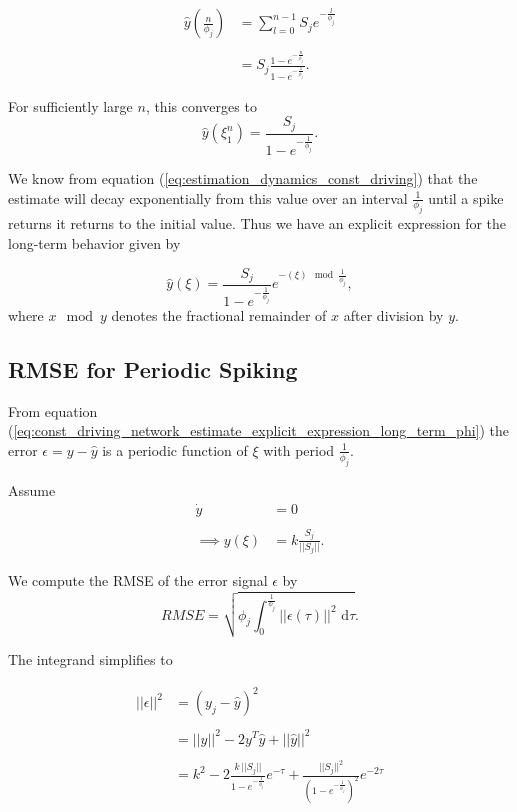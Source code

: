 \begin{align*}
\hat{y}(\frac{n}{\phi_j}) &= \sum_{l=0}^{n-1} S_j e^{- \frac{l}{\phi_j}}  \\
\\
&= S_j \frac
{ 1 - e^{-\frac{n}{\phi_j}}  }
{ 1 - e^{-\frac{1}{\phi_j}}  }.
\end{align*}

For sufficiently large $n$, this converges to 
$$
\hat{y}(\xi_1^n) = \frac{S_j}{1 - e^{-\frac{1}{\phi_j}}}.
$$



We know from equation (\ref{eq:estimation_dynamics_const_driving}) that the estimate will decay exponentially from this value over an interval $\frac{1}{\phi_j}$ until a spike returns it returns to the initial value. Thus we have an explicit expression for the long-term behavior given by 

\begin{equation}
\label{eq:const_driving_network_estimate_explicit_expression_long_term_phi}
\hat{y}(\xi) =
\frac{S_j}{1 - e^{-\frac{1}{\phi_j}}} e^{- (\xi) \mod{\frac{1}{\phi_j}}},
\end{equation} 
where $x \mod{y}$ denotes the fractional remainder of $x$ after division by $y$. 







\subsection{ RMSE for Periodic Spiking} From equation (\ref{eq:const_driving_network_estimate_explicit_expression_long_term_phi}) the error $\epsilon = y - \hat{y}$ is a periodic function of $\xi$ with period $\frac{1}{\phi_j}$. 

Assume 
\begin{align*}
 \dot{y} &= 0 
 \\
 \\
 \implies y(\xi) &= k \frac{S_j}{||S_j||}.
\end{align*}
 
We compute the  RMSE of the error signal  $\epsilon$ by 
\begin{equation}
\label{eq:per_spike_rmse_def}
RMSE = \sqrt{\phi_j \int_{0}^{\frac{1}{\phi_j}} \!  ||\epsilon(\tau)||^2 \, \, \mathrm{d}\tau}.
\end{equation}

The integrand simplifies to 

\begin{align*}
||\epsilon||^2  &= (y_j - \hat{y})^2 
\\
\\
&= ||y||^2 - 2 y^T\hat{y} + ||\hat{y}||^2
\\
\\
&= k^2 - 2  \frac{k \, ||S_j||}{1 - e^{-\frac{1}{\phi_j}}} e^{-\tau}  + \frac{||S_j||^2}{\left(1 - e^{-\frac{1}{\phi_j}}\right)^2}e^{-2\tau}
\\
\\
\end{align*}

